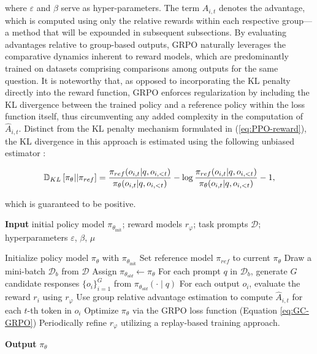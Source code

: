 \begin{itemize}[topsep=0pt]
\begin{itemize}[topsep=0pt]
where $\varepsilon$ and $\beta$ serve as hyper-parameters. The term $\hat{A}_{i,t}$ denotes the advantage, which is computed using only the relative rewards within each respective group—a method that will be expounded in subsequent subsections. By evaluating advantages relative to group-based outputs, GRPO naturally leverages the comparative dynamics inherent to reward models, which are predominantly trained on datasets comprising comparisons among outputs for the same question. It is noteworthy that, as opposed to incorporating the KL penalty directly into the reward function, GRPO enforces regularization by including the KL divergence between the trained policy and a reference policy within the loss function itself, thus circumventing any added complexity in the computation of $\hat{A}_{i,t}$. Distinct from the KL penalty mechanism formulated in (\ref{eq:PPO-reward}), the KL divergence in this approach is estimated using the following unbiased estimator \citep{kl_approx}:

\begin{equation}
\small
    \mathbb{D}_{KL}\left[\pi_{\theta} || \pi_{ref}\right] = \frac{\pi_{ref}(o_{i,t}|q,o_{i,<t})}{\pi_{\theta}(o_{i,t}|q,o_{i,<t})}- \log\frac{\pi_{ref}(o_{i,t}|q,o_{i,<t})}{\pi_{\theta}(o_{i,t}|q,o_{i,<t})} - 1,
\end{equation}

which is guaranteed to be positive.

\begin{algorithm}[t]
  \small
  \caption{Iterative Group Relative Policy Optimization}
  \textbf{Input} initial policy model $\pi_{\theta_{\text{init}}}$; reward models $r_\varphi$; task prompts $\mathcal{D}$; 
  hyperparameters $\varepsilon$, $\beta$, $\mu$
  \begin{algorithmic}[1]
    \State Initialize policy model $\pi_\theta$ with $\pi_{\theta_{\text{init}}}$
       \State Set reference model $\pi_{ref}$ to current $\pi_{\theta}$
      \State Draw a mini-batch $\mathcal{D}_b$ from $\mathcal{D}$
      \State Assign $\pi_{\theta_{old}} \gets \pi_{\theta}$
      \State For each prompt $q$ in $\mathcal{D}_b$, generate $G$ candidate responses $\{o_i\}_{i=1}^G$ from $\pi_{\theta_{old}} (\cdot \mid q)$
      \State For each output $o_i$, evaluate the reward $r_i$ using $r_{\varphi}$
      \State Use group relative advantage estimation to compute $\hat{A}_{i,t}$ for each $t$-th token in $o_i$
        \State Optimize $\pi_{\theta}$ via the GRPO loss function (Equation \ref{eq:GC-GRPO})
      \EndFor
    \EndFor
    \State Periodically refine $r_\varphi$ utilizing a replay-based training approach.
    \EndFor 
  \end{algorithmic}
  \textbf{Output} $\pi_\theta$
  \label{alg:iter-grpo}
\end{algorithm}


\end{itemize}
\end{itemize}

